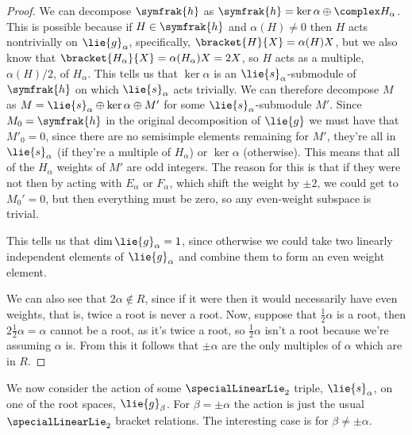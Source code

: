 \documentclass[fleqn]{NotesClass}
\newcommand{\csa}{\symfrak{h}}
\begin{document}
\begin{lma}{}{}
\begin{proof}
            We can decompose \(\csa\) as \(\csa = \ker \alpha \oplus \complex H_\alpha\).
            This is possible because if \(H \in \csa\) and \(\alpha(H) \ne 0\) then \(H\) acts nontrivially on \(\lie{g}_\alpha\), specifically, \(\bracket{H}{X} = \alpha(H)X\), but we also know that \(\bracket{H_\alpha}{X} = \alpha(H_\alpha)X = 2X\), so \(H\) acts as a multiple, \(\alpha(H)/2\), of \(H_\alpha\).
            This tells us that \(\ker \alpha\) is an \(\lie{s}_\alpha\)-submodule of \(\csa\) on which \(\lie{s}_\alpha\) acts trivially.
            We can therefore decompose \(M\) as \(M = \lie{s}_\alpha \oplus \ker \alpha \oplus M'\) for some \(\lie{s}_\alpha\)-submodule \(M'\).
            Since \(M_0 = \csa\) in the original decomposition of \(\lie{g}\) we must have that \(M'_0 = 0\), since there are no semisimple elements remaining for \(M'\), they're all in \(\lie{s}_\alpha\) (if they're a multiple of \(H_\alpha\)) or \(\ker \alpha\) (otherwise).
            This means that all of the \(H_\alpha\) weights of \(M'\) are odd integers.
            The reason for this is that if they were not then by acting with \(E_\alpha\) or \(F_\alpha\), which shift the weight by \(\pm 2\), we could get to \(M_0' = 0\), but then everything must be zero, so any even-weight subspace is trivial.
            
            This tells us that \(\dim \lie{g}_\alpha = 1\), since otherwise we could take two linearly independent elements of \(\lie{g}_\alpha\) and combine them to form an even weight element.
            
            We can also see that \(2\alpha \notin R\), since if it were then it would necessarily have even weights, that is, twice a root is never a root.
            Now, suppose that \(\frac{1}{2}\alpha\) is a root, then \(2 \frac{1}{2}\alpha = \alpha\) cannot be a root, as it's twice a root, so \(\frac{1}{2}\alpha\) isn't a root because we're assuming \(\alpha\) is.
            From this it follows that \(\pm \alpha\) are the only multiples of \(\alpha\) which are in \(R\).
        \end{proof}
    \end{lma}
    
    We now consider the action of some \(\specialLinearLie_2\) triple, \(\lie{s}_\alpha\), on one of the root spaces, \(\lie{g}_\beta\).
    For \(\beta = \pm \alpha\) the action is just the usual \(\specialLinearLie_2\) bracket relations.
    The interesting case is for \(\beta \ne \pm \alpha\).
    
\end{document}
